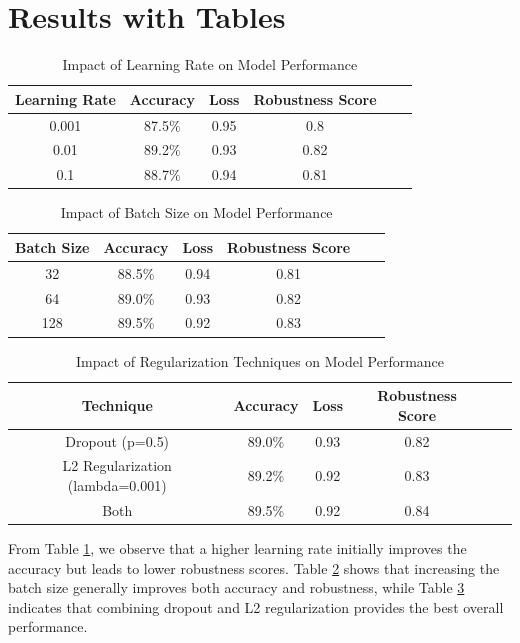 \documentclass{article}
\begin{document}
\section{Results with Tables}
\begin{table}[ht]
    \centering
    \caption{Impact of Learning Rate on Model Performance}
    \label{tab:learning_rate}
    \begin{tabular}{@{}cccccc@{}}
    \toprule
    Learning Rate & Accuracy & Loss & Robustness Score \\
    \midrule
    0.001 & 87.5\% & 0.95 & 0.8 \\
    0.01 & 89.2\% & 0.93 & 0.82 \\
    0.1 & 88.7\% & 0.94 & 0.81 \\
    \bottomrule
    \end{tabular}
\end{table}

\begin{table}[ht]
    \centering
    \caption{Impact of Batch Size on Model Performance}
    \label{tab:batch_size}
    \begin{tabular}{@{}cccccc@{}}
    \toprule
    Batch Size & Accuracy & Loss & Robustness Score \\
    \midrule
    32 & 88.5\% & 0.94 & 0.81 \\
    64 & 89.0\% & 0.93 & 0.82 \\
    128 & 89.5\% & 0.92 & 0.83 \\
    \bottomrule
    \end{tabular}
\end{table}

\begin{table}[ht]
    \centering
    \caption{Impact of Regularization Techniques on Model Performance}
    \label{tab:regularization}
    \begin{tabular}{@{}cccccc@{}}
    \toprule
    Technique & Accuracy & Loss & Robustness Score \\
    \midrule
    Dropout (p=0.5) & 89.0\% & 0.93 & 0.82 \\
    L2 Regularization (lambda=0.001) & 89.2\% & 0.92 & 0.83 \\
    Both & 89.5\% & 0.92 & 0.84 \\
    \bottomrule
    \end{tabular}
\end{table}

From Table \ref{tab:learning_rate}, we observe that a higher learning rate initially improves the accuracy but leads to lower robustness scores. Table \ref{tab:batch_size} shows that increasing the batch size generally improves both accuracy and robustness, while Table \ref{tab:regularization} indicates that combining dropout and L2 regularization provides the best overall performance.
\end{document}
